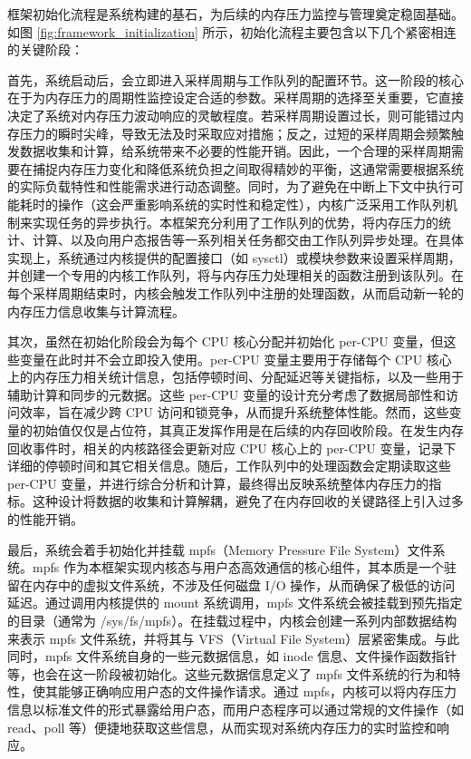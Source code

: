 框架初始化流程是系统构建的基石，为后续的内存压力监控与管理奠定稳固基础。如图 \ref{fig:framework_initialization} 所示，初始化流程主要包含以下几个紧密相连的关键阶段：

首先，系统启动后，会立即进入采样周期与工作队列的配置环节。这一阶段的核心在于为内存压力的周期性监控设定合适的参数。采样周期的选择至关重要，它直接决定了系统对内存压力波动响应的灵敏程度。若采样周期设置过长，则可能错过内存压力的瞬时尖峰，导致无法及时采取应对措施；反之，过短的采样周期会频繁触发数据收集和计算，给系统带来不必要的性能开销。因此，一个合理的采样周期需要在捕捉内存压力变化和降低系统负担之间取得精妙的平衡，这通常需要根据系统的实际负载特性和性能需求进行动态调整。同时，为了避免在中断上下文中执行可能耗时的操作（这会严重影响系统的实时性和稳定性），内核广泛采用工作队列机制来实现任务的异步执行。本框架充分利用了工作队列的优势，将内存压力的统计、计算、以及向用户态报告等一系列相关任务都交由工作队列异步处理。在具体实现上，系统通过内核提供的配置接口（如 sysctl）或模块参数来设置采样周期，并创建一个专用的内核工作队列，将与内存压力处理相关的函数注册到该队列。在每个采样周期结束时，内核会触发工作队列中注册的处理函数，从而启动新一轮的内存压力信息收集与计算流程。

其次，虽然在初始化阶段会为每个 CPU 核心分配并初始化 per-CPU 变量，但这些变量在此时并不会立即投入使用。per-CPU 变量主要用于存储每个 CPU 核心上的内存压力相关统计信息，包括停顿时间、分配延迟等关键指标，以及一些用于辅助计算和同步的元数据。这些 per-CPU 变量的设计充分考虑了数据局部性和访问效率，旨在减少跨 CPU 访问和锁竞争，从而提升系统整体性能。然而，这些变量的初始值仅仅是占位符，其真正发挥作用是在后续的内存回收阶段。在发生内存回收事件时，相关的内核路径会更新对应 CPU 核心上的 per-CPU 变量，记录下详细的停顿时间和其它相关信息。随后，工作队列中的处理函数会定期读取这些 per-CPU 变量，并进行综合分析和计算，最终得出反映系统整体内存压力的指标。这种设计将数据的收集和计算解耦，避免了在内存回收的关键路径上引入过多的性能开销。

最后，系统会着手初始化并挂载 mpfs（Memory Pressure File System）文件系统。mpfs 作为本框架实现内核态与用户态高效通信的核心组件，其本质是一个驻留在内存中的虚拟文件系统，不涉及任何磁盘 I/O 操作，从而确保了极低的访问延迟。通过调用内核提供的 mount 系统调用，mpfs 文件系统会被挂载到预先指定的目录（通常为 /sys/fs/mpfs）。在挂载过程中，内核会创建一系列内部数据结构来表示 mpfs 文件系统，并将其与 VFS（Virtual File System）层紧密集成。与此同时，mpfs 文件系统自身的一些元数据信息，如 inode 信息、文件操作函数指针等，也会在这一阶段被初始化。这些元数据信息定义了 mpfs 文件系统的行为和特性，使其能够正确响应用户态的文件操作请求。通过 mpfs，内核可以将内存压力信息以标准文件的形式暴露给用户态，而用户态程序可以通过常规的文件操作（如 read、poll 等）便捷地获取这些信息，从而实现对系统内存压力的实时监控和响应。


